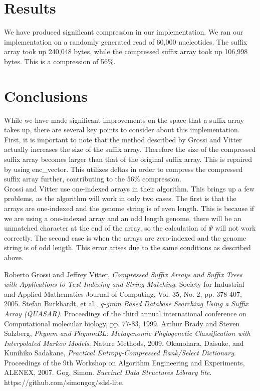 \documentclass{article}
\begin{document}
\section{Results}
\label{sec-results}
We have produced significant compression in our implementation. We ran our implementation on a randomly generated read of 60,000 nucleotides. The suffix array took up 240,048 bytes, while the compressed suffix array took up 106,998 bytes. This is a compression of 56\%.\\
\section{Conclusions}
\label{sec-conclusions}
While we have made significant improvements on the space that a suffix array takes up, there are several key points to consider about this implementation.\\
\indent First, it is important to note that the method described by Grossi and Vitter actually increases the size of the suffix array. Therefore the size of the compressed suffix array becomes larger than that of the original suffix array. This is repaired by using enc\_vector. This utilizes deltas in order to compress the compressed suffix array further, contributing to the 56\% compression.\\
\indent Grossi and Vitter use one-indexed arrays in their algorithm. This brings up a few problems, as the algorithm will work in only two cases. The first is that the arrays are one-indexed and the genome string is of even length. This is because if we are using a one-indexed array and an odd length genome, there will be an unmatched character at the end of the array, so the calculation of $\Psi$ will not work correctly. The second case is when the arrays are zero-indexed and the genome string is of odd length. This error arises due to the same conditions as described above.\\

\begin{thebibliography}{1}
	Roberto Grossi and Jeffrey Vitter,
	\emph{Compressed Suffix Arrays and Suffix Trees with Applications to Text Indexing and String Matching}.
	Society for Industrial and Applied Mathematics Journal of Computing,
	Vol. 35, No. 2, pp. 378-407,
	2005.
	Stefan Burkhardt, et al.,
	\emph{q-gram Based Database Searching Using a Suffix Array (QUASAR)}.
	Proceedings of the third annual international conference on Computational molecular biology,
	pp. 77-83,
	1999.
	Arthur Brady and Steven Salzberg,
	\emph{Phymm and PhymmBL: Metagenomic Phylogenetic Classification with Interpolated Markov Models}.
	Nature Methods,
	2009.
	Okanohara, Daisuke, and Kunihiko Sadakane,
	\emph{Practical Entropy-Compressed Rank/Select Dictionary}. 
	Proceedings of the 9th Workshop on Algorithm Engineering and Experiments,
	ALENEX,
	2007.
	Gog, Simon.
	\emph{Succinct Data Structures Library lite}.
	https://github.com/simongog/sdsl-lite.
\end{thebibliography}
\end{document}
